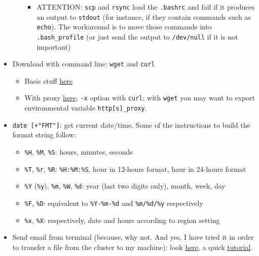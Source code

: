 \documentclass[a4paper,12pt,%
              final%
              ]{article}
\begin{document}
\begin{itemize}
\begin{itemize}
\begin{itemize}
\begin{itemize}
            \end{itemize}
          \item ATTENTION: \texttt{scp} and \texttt{rsync} load the \texttt{.bashrc} and fail if it produces an output to \texttt{stdout} (for instance, if they contain commands such as \texttt{echo}). The workaround is to move those commands into \texttt{.bash\_profile} (or just send the output to \verb|/dev/null| if it is not important)
        \end{itemize}
    \end{itemize}
  \item Download with command line: \texttt{wget} and \texttt{curl}
    \begin{itemize}
      \item Basic stuff \href{https://linuxconfig.org/download-file-from-url-on-linux-using-command-line}{here}
      \item With proxy \href{https://www.cyberciti.biz/faq/linux-unix-curl-command-with-proxy-username-password-http-options/}{here}; \verb|-x| option with \texttt{curl}; with \texttt{wget} you may want to export environmental variable \verb|http[s]_proxy|.
    \end{itemize}
  \item \verb|date [+"FMT"]|: get current date/time. Some of the instructions to build the format string follow:
    \begin{itemize}
      \item \verb|%H|, \verb|%M|, \verb|%S|: hours, minutes, seconds
      \item \verb|%T|, \verb|%r|, \verb|%R|: \verb|%H:%M:%S|, hour in 12-hours format, hour in 24-hours format
      \item \verb|%Y| (\verb|%y|), \verb|%m|, \verb|%W|, \verb|%d|: year (last two digits only), month, week, day
      \item \verb|%F|, \verb|%D|: equivalent to \verb|%Y-%m-%d| and \verb|%m/%d/%y| respectively
      \item \verb|%x|, \verb|%X|: respectively, date and hours according to region setting
    \end{itemize}
  \item Send email from terminal (because, why not. And yes, I have tried it in order to transfer a file from the cluster to my machine): look \href{https://www.tecmint.com/send-email-attachment-from-linux-commandline/}{here}, a quick \href{https://www.interserver.net/tips/kb/linux-mail-command-usage-examples/}{tutorial}.
\begin{verbatim}

\end{verbatim}
\end{itemize}
\end{document}
